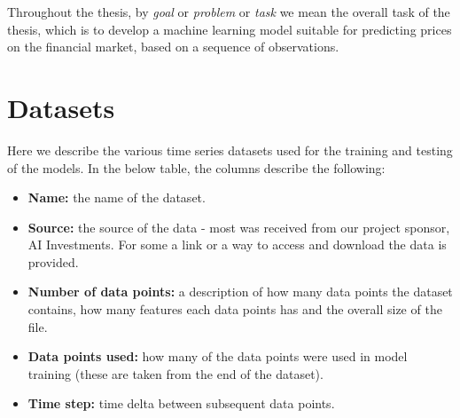 Throughout the thesis, by \emph{goal} or \emph{problem} or \emph{task} we mean the overall task of the thesis, which is to develop a machine learning model suitable for predicting prices on the financial market, based on a sequence of observations.

\section{Datasets}
Here we describe the various time series datasets used for the training and testing of the models. In the below table, the columns describe the following:
\begin{itemize}
	\item \textbf{Name:} the name of the dataset.
	\item \textbf{Source:} the source of the data - most was received from our project sponsor, AI Investments. For some a link or a way to access and download the data is provided.
	\item \textbf{Number of data points:} a description of how many data points the dataset contains, how many features each data points has and the overall size of the file.
	\item \textbf{Data points used:} how many of the data points were used in model training (these are taken from the end of the dataset).
	\item \textbf{Time step:} time delta between subsequent data points.
\end{itemize}



